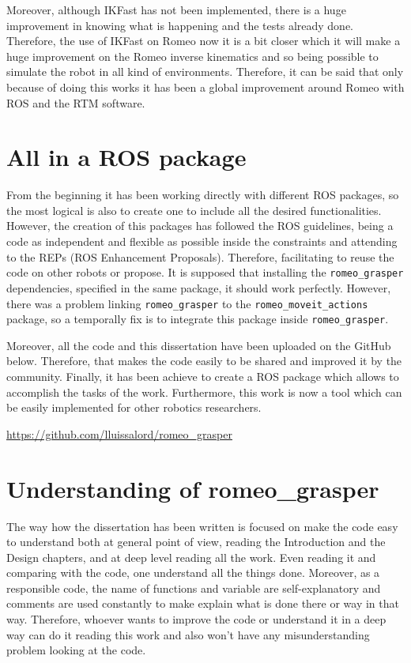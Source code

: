\documentclass[12pt,a4paper,final,twoside,openright]{report}
\begin{document}
\break
Moreover, although IKFast has not been implemented, there is a huge improvement in knowing what is happening and the tests already done. Therefore, the use of IKFast on Romeo now it is a bit closer which it will make a huge improvement on the Romeo inverse kinematics and so being possible to simulate the robot in all kind of environments. Therefore, it can be said that only because of doing this works it has been a global improvement around Romeo with ROS and the RTM software.

\section{All in a ROS package}

From the beginning it has been working directly with different ROS packages, so the most logical is also to create one to include all the desired functionalities. However, the creation of this packages has followed the ROS guidelines, being a code as independent and flexible as possible inside the constraints and attending to the REPs (ROS Enhancement Proposals). Therefore, facilitating to reuse the code on other robots or propose. It is supposed that installing the \texttt{romeo\_grasper} dependencies, specified in the same package, it should work perfectly. However, there was a problem linking \texttt{romeo\_grasper} to the \texttt{romeo\_moveit\_actions} package, so a temporally fix is to integrate this package inside \texttt{romeo\_grasper}.

Moreover, all the code and this dissertation have been uploaded on the GitHub below. Therefore, that makes the code easily to be shared and improved it by the community. Finally, it has been achieve to create a ROS package which allows to accomplish the tasks of the work. Furthermore, this work is now a tool which can be easily implemented for other robotics researchers.

\url{https://github.com/lluissalord/romeo_grasper}

\section{Understanding of romeo\_grasper}

The way how the dissertation has been written is focused on make the code easy to understand both at general point of view, reading the Introduction and the Design chapters, and at deep level reading all the work. Even reading it and comparing with the code, one understand all the things done. Moreover, as a responsible code, the name of functions and variable are self-explanatory and comments are used constantly to make explain what is done there or way in that way. Therefore, whoever wants to improve the code or understand it in a deep way can do it reading this work and also won't have any misunderstanding problem looking at the code.
\end{document}
